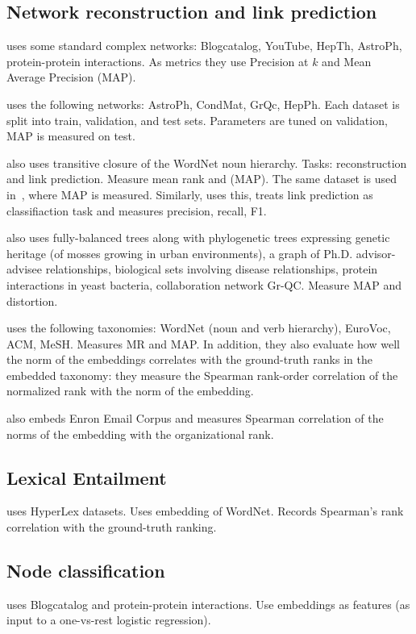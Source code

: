 \documentclass{article}
\begin{document}
\subsection{Network reconstruction and link prediction}

\cite{goyal2018graph} uses some standard complex networks: Blogcatalog, YouTube, HepTh, AstroPh, protein-protein interactions. As metrics they use Precision at $k$ and Mean Average Precision (MAP).

\cite{nickel2017poincare} uses the following networks: AstroPh, CondMat, GrQc, HepPh. Each dataset is split into train, validation, and test sets. Parameters are tuned on validation, MAP is measured on test. 

\cite{nickel2017poincare} also uses transitive closure of the WordNet noun hierarchy. Tasks: reconstruction and link prediction. Measure mean rank and (MAP).  The same dataset is used in~\cite{sala2018representation}, where MAP is measured. Similarly, \cite{ganea2018hyperbolic} uses this, treats link prediction as classifiaction task and measures precision, recall, F1.

\cite{sala2018representation} also uses fully-balanced trees along with phylogenetic trees expressing genetic heritage (of mosses growing in urban
environments), a graph of Ph.D. advisor-advisee relationships, biological sets involving disease relationships, protein interactions in yeast bacteria, collaboration network Gr-QC. Measure MAP and distortion. 

\cite{nickel2018learning} uses the following taxonomies: WordNet (noun and verb hierarchy), EuroVoc, ACM, MeSH. Measures MR and MAP. In addition, they also evaluate how well the norm of the embeddings  correlates with
the ground-truth ranks in the embedded taxonomy: they measure the Spearman rank-order correlation of the normalized rank with the norm of the embedding. 
 
\cite{nickel2018learning} also embeds Enron Email Corpus and measures Spearman correlation of the norms of the embedding with
the organizational rank.

 
\subsection{Lexical Entailment}

\cite{nickel2017poincare} uses HyperLex datasets. Uses embedding of WordNet. Records Spearman’s rank correlation
with the ground-truth ranking. 

\subsection{Node classification}

\cite{goyal2018graph} uses Blogcatalog and protein-protein interactions. Use embeddings as features (as input to a one-vs-rest logistic regression).
	




\end{document}
